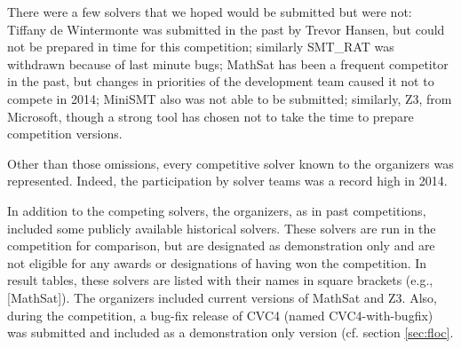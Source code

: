 \documentclass[twosize,11pt]{article}
\begin{document}
There were a few solvers that we hoped would be submitted but were not: Tiffany de Wintermonte was submitted in the past by Trevor Hansen, but could not be prepared in time for this competition; similarly SMT\_RAT was withdrawn because of last minute bugs; MathSat has been a frequent competitor in the past, but changes in priorities of the development team caused it not to compete in 2014; MiniSMT also was not able to be submitted; similarly, Z3, from Microsoft, though a strong tool has chosen not to take the time to prepare competition versions.

Other than those omissions, every competitive solver known to the organizers was represented. Indeed, the
 participation by solver teams was a record high in 2014. 

In addition to the competing solvers, the organizers, as in past competitions, included some publicly available historical solvers. These solvers are run in the competition for comparison, but are designated as demonstration only and are not eligible for any awards or designations of having won the competition. In result tables, these solvers are listed with their names in square brackets (e.g., [MathSat]). The organizers included current versions of MathSat and Z3. Also, during the competition, a bug-fix release of CVC4 (named CVC4-with-bugfix) was submitted and included as a demonstration only version (cf. section \ref{sec:floc}.
\end{document}
